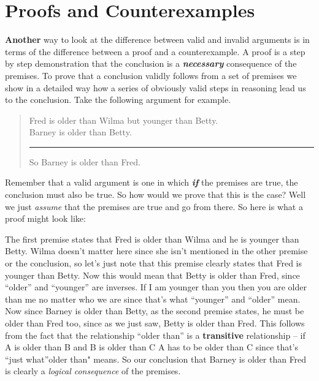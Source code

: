 \documentclass[]{book}
\makeatletter
\newenvironment{kframe}{%
\medskip{}
\setlength{\fboxsep}{.8em}
 \def\at@end@of@kframe{}%
 \ifinner\ifhmode%
  \def\at@end@of@kframe{\end{minipage}}%
  \begin{minipage}{\columnwidth}%
 \fi\fi%
 \def\FrameCommand##1{\hskip\@totalleftmargin \hskip-\fboxsep
 \colorbox{shadecolor}{##1}\hskip-\fboxsep
     \hskip-\linewidth \hskip-\@totalleftmargin \hskip\columnwidth}%
 \MakeFramed {\advance\hsize-\width
   \@totalleftmargin\z@ \linewidth\hsize
   \@setminipage}}%
 {\par\unskip\endMakeFramed%
 \at@end@of@kframe}
\newenvironment{rmdblock}[1]
  {
  \begin{itemize}
  \renewcommand{\labelitemi}{
    \raisebox{-.7\height}[0pt][0pt]{
      {\setkeys{Gin}{width=3em,keepaspectratio}\texttt{[image: img/\#1]}}
    }
  }
  \setlength{\fboxsep}{1em}
  \begin{kframe}
  \item
  }
  {
  \end{kframe}
  \end{itemize}
  }
\newenvironment{rmdtip}
  {\begin{rmdblock}{tip}}
  {\end{rmdblock}}
\newenvironment{argument}{\begin{quote}\normalsize}{\end{quote}}
\makeatother
\begin{document}
\hypertarget{proofs-and-counterexamples}{%
\section{Proofs and Counterexamples}\label{proofs-and-counterexamples}}

\textbf{Another} way to look at the difference between valid and invalid arguments is in terms of the difference between a proof and a counterexample. A proof is a step by step demonstration that the conclusion is a \textbf{\emph{necessary}} consequence of the premises. To prove that a conclusion validly follows from a set of premises we show in a detailed way how a series of obviously valid steps in reasoning lead us to the conclusion. Take the following argument for example.

\begin{argument}
Fred is older than Wilma but younger than Betty.\\
Barney is older than Betty.

\begin{center}\rule{0.5\linewidth}{\linethickness}\end{center}

So Barney is older than Fred.
\end{argument}

Remember that a valid argument is one in which \textbf{\emph{if}} the premises are true, the conclusion must also be true. So how would we prove that this is the case? Well we just \emph{assume} that the premises are true and go from there. So here is what a proof might look like:

\begin{rmdtip}
The first premise states that Fred is older than Wilma and he is younger
than Betty. Wilma doesn't matter here since she isn't mentioned in the
other premise or the conclusion, so let's just note that this premise
clearly states that Fred is younger than Betty. Now this would mean that
Betty is older than Fred, since ``older'' and ``younger'' are inverses.
If I am younger than you then you are older than me no matter who we are
since that's what ``younger'' and ``older'' mean. Now since Barney is
older than Betty, as the second premise states, he must be older than
Fred too, since as we just saw, Betty is older than Fred. This follows
from the fact that the relationship ``older than'' is a
\textbf{transitive} relationship -- if A is older than B and B is older
than C A has to be older than C since that's ``just what''older than"
means. So our conclusion that Barney is older than Fred is clearly a
\emph{logical consequence} of the premises.
\end{rmdtip}
\end{document}
